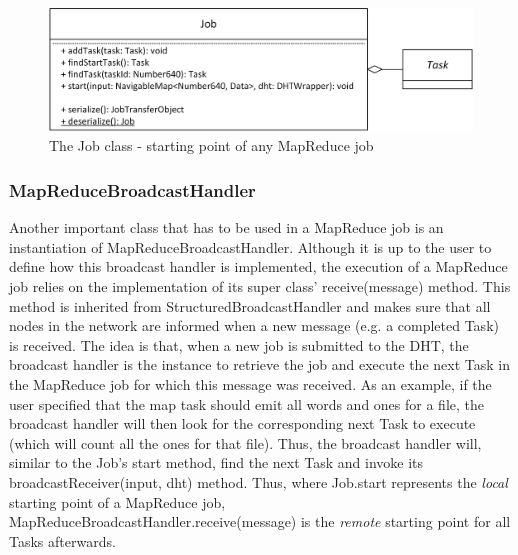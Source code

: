 \begin{figure}
	\centering	
	\includegraphics{imgs/jobtask}
	\caption{The Job class - starting point of any MapReduce job}	
	\label{fig:jobtask}
\end{figure} 
\subsubsection{MapReduceBroadcastHandler}
Another important class that has to be used in a MapReduce job is an instantiation of MapReduceBroadcastHandler. Although it is up to the user to define how this broadcast handler is implemented, the execution of a MapReduce job relies on the implementation of its super class' receive(message) method. This method is inherited from StructuredBroadcastHandler and makes sure that all nodes in the network are informed when a new message (e.g. a completed Task) is received. The idea is that, when a new job is submitted to the DHT, the broadcast handler is the instance to retrieve the job and execute the next Task in the MapReduce job for which this message was received. As an example, if the user specified that the map task should emit all words and ones for a file, the broadcast handler will then look for the corresponding next Task to execute (which will count all the ones for that file). Thus, the broadcast handler will, similar to the Job's start method, find the next Task and invoke its broadcastReceiver(input, dht) method. Thus, where Job.start represents the \textit{local} starting point of a MapReduce job, MapReduceBroadcastHandler.receive(message) is the \textit{remote} starting point for all Tasks afterwards.
